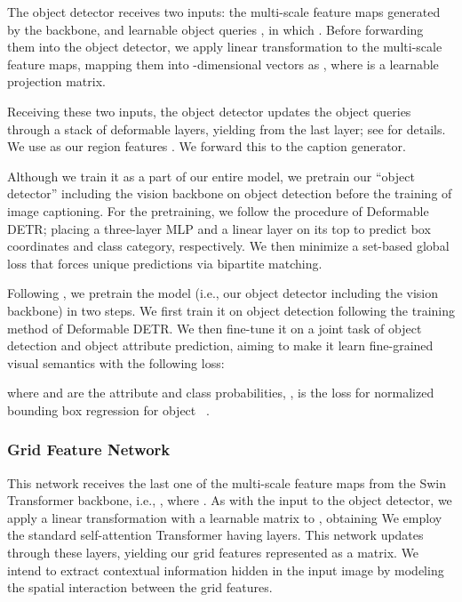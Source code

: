 \documentclass[runningheads]{llncs}
\begin{document}
The object detector receives two inputs: the multi-scale feature maps generated by the backbone, and  learnable object queries , in which . Before forwarding them into the object detector, we apply linear transformation to the multi-scale feature maps, mapping them into -dimensional vectors as  , where  is a learnable projection matrix.


Receiving these two inputs, the object detector updates the object queries through a stack of  deformable layers, yielding  from the last layer; see \cite{zhu2021deformable} for details. We use  as our region features . We forward this to the caption generator. 

Although we train it as a part of our entire model, we pretrain our ``object detector'' including the vision backbone on object detection before the training of image captioning.
For the pretraining, we follow the procedure of Deformable DETR; placing a three-layer MLP and a linear layer on its top to predict box coordinates and class category, respectively.
We then minimize a set-based global loss that forces unique predictions via bipartite matching.

Following \cite{anderson2018bottom,zhang2021vinvl}, 
we pretrain the model (i.e., our object detector including the vision backbone) in two steps. 
We first train it on object detection following the training method of Deformable DETR. We then fine-tune it on a joint task of object detection and object attribute prediction, aiming to make it learn fine-grained visual semantics with the following loss:

where  and  are the attribute and class probabilities, , is the loss for normalized bounding box regression for object ~\cite{zhu2021deformable}.

\subsubsection{Grid Feature Network}

This network receives the last one of the multi-scale feature maps from the Swin Transformer backbone, i.e., , where . As with the input to the object detector, we apply a linear transformation with a learnable matrix  to , obtaining 
We employ the standard self-attention Transformer having  layers. This network updates  through these layers, yielding our grid features  represented as a  matrix. We intend to extract contextual information hidden in the input image by modeling the spatial interaction between the grid features. 
\end{document}
